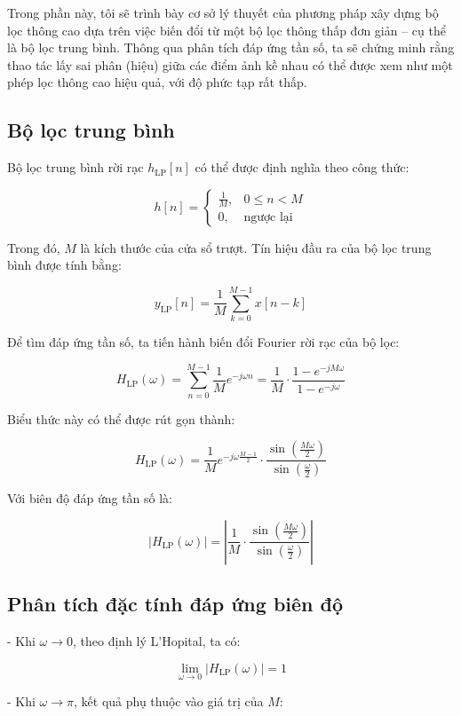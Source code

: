 Trong phần này, tôi sẽ trình bày cơ sở lý thuyết của phương pháp xây dựng bộ lọc thông cao dựa trên việc biến đổi từ một bộ lọc thông thấp đơn giản – cụ thể là bộ lọc trung bình. 
%
Thông qua phân tích đáp ứng tần số, ta sẽ chứng minh rằng thao tác lấy sai phân (hiệu) giữa các điểm ảnh kề nhau có thể được xem như một phép lọc thông cao hiệu quả, với độ phức tạp rất thấp.

\subsection{Bộ lọc trung bình}

Bộ lọc trung bình rời rạc \( h_{\mathrm{LP}}[n] \) có thể được định nghĩa theo công thức:

\[
h[n] =
\begin{cases}
	\frac{1}{M}, & 0 \leq n < M \\
	0, & \text{ngược lại}
\end{cases}
\]

Trong đó, \( M \) là kích thước của cửa sổ trượt. Tín hiệu đầu ra của bộ lọc trung bình được tính bằng:

\[
y_{\mathrm{LP}}[n] = \frac{1}{M} \sum_{k=0}^{M-1} x[n-k]
\]

Để tìm đáp ứng tần số, ta tiến hành biến đổi Fourier rời rạc của bộ lọc:

\[
H_{\mathrm{LP}}(\omega) = \sum_{n=0}^{M-1} \frac{1}{M} e^{-j \omega n} = \frac{1}{M} \cdot \frac{1 - e^{-j M \omega}}{1 - e^{-j \omega}}
\]

Biểu thức này có thể được rút gọn thành:

\[
H_{\mathrm{LP}}(\omega) = \frac{1}{M} e^{-j \omega \frac{M-1}{2}} \cdot \frac{\sin\left(\frac{M \omega}{2}\right)}{\sin\left(\frac{\omega}{2}\right)}
\]

Với biên độ đáp ứng tần số là:

\[
|H_{\mathrm{LP}}(\omega)| = \left| \frac{1}{M} \cdot \frac{\sin\left( \frac{M \omega}{2} \right)}{\sin\left( \frac{\omega}{2} \right)} \right|
\]

\subsection*{Phân tích đặc tính đáp ứng biên độ}

- Khi \( \omega \to 0 \), theo định lý L'Hopital, ta có:

\[
\lim_{\omega \to 0} |H_{\mathrm{LP}}(\omega)| = 1
\]

- Khi \( \omega \to \pi \), kết quả phụ thuộc vào giá trị của \( M \):

